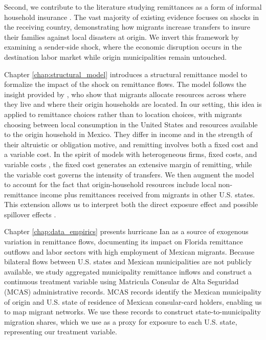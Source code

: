 \par
Second, we contribute to the literature studying remittances as a form of informal household insurance \parencite{dorantes_pozo_2006}. The vast majority of existing evidence focuses on shocks in the receiving country, demonstrating how migrants increase transfers to insure their families against local disasters at origin. We invert this framework by examining a sender-side shock, where the economic disruption occurs in the destination labor market while origin municipalities remain untouched.
\par
Chapter \ref{chap:structural_model} introduces a structural remittance model to formalize the impact of the shock on remittance flows. The model follows the insight provided by \textcite{albert_monras_2022}, who show that migrants allocate resources across where they live and where their origin households are located. In our setting, this idea is applied to remittance choices rather than to location choices, with migrants choosing between local consumption in the United States and resources available to the origin household in Mexico. They differ in income and in the strength of their altruistic or obligation motive, and remitting involves both a fixed cost and a variable cost. In the spirit of models with heterogeneous firms, fixed costs, and variable costs \parencite{melitz2003}, the fixed cost generates an extensive margin of remitting, while the variable cost governs the intensity of transfers. We then augment the model to account for the fact that origin-household resources include local non-remittance income plus remittances received from migrants in other U.S. states. This extension allows us to interpret both the direct exposure effect and possible spillover effects \parencite{hudgens2008}.
\par
Chapter \ref{chap:data_empirics} presents hurricane Ian as a source of exogenous variation in remittance flows, documenting its impact on Florida remittance outflows and labor sectors with high employment of Mexican migrants. Because bilateral flows between U.S. states and Mexican municipalities are not publicly available, we study aggregated municipality remittance inflows and construct a continuous treatment variable using Matricula Consular de Alta Seguridad (MCAS) administrative records. MCAS records identify the Mexican municipality of origin and U.S. state of residence of Mexican consular-card holders, enabling us to map migrant networks. We use these records to construct state-to-municipality migration shares, which we use as a proxy for exposure to each U.S. state, representing our treatment variable.
